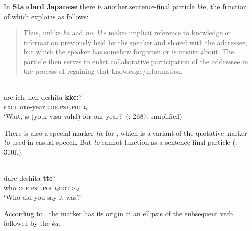 In \textbf{Standard Japanese} there is another sentence-final particle \textit{kk}e, the function of which \citet[2687]{HayashiM2010} explains as follows:

\begin{quote}
Thus, unlike \textit{ka} and \textit{no}, \textit{kke} makes implicit reference to knowledge or information previously held by the speaker and shared with the addressee, but which the speaker has somehow forgotten or is unsure about. The particle then serves to enlist collaborative participation of the addressee in the process of regaining that knowledge/information.
\end{quote}

\ea%
    \label{ex:japa:12}
    \\
    \gll are  ichi-nen  deshita \textbf{{kke:}}?\\
    \textsc{excl}  one-year  \textsc{cop.pst.pol}  \textsc{q}\\
    \glt ‘Wait, is (your visa valid) for one year?’ (\citealt{HayashiM2010}: 2687, simplified)
    \z

There is also a special marker \textit{tte} for , which is a variant of the quotative marker \textit{to} used in casual speech. But \textit{to} cannot function as a sentence-final particle (\citealt{Hasegawa2015}: 310f.).

\ea%
    \label{ex:japa:13}
    \\
    \gll dare  deshita \textbf{{tte}}?\\
    who  \textsc{cop}.\textsc{pst.pol}  \textsc{quot}>\textsc{q}\\
    \glt ‘Who did you say it was?’ \citep[165]{Hinds1984}
    \z

\noindent According to \citet[165]{Hinds1984}, the marker has its origin in an ellipsis of the subsequent  verb followed by the  \textit{ka}.

